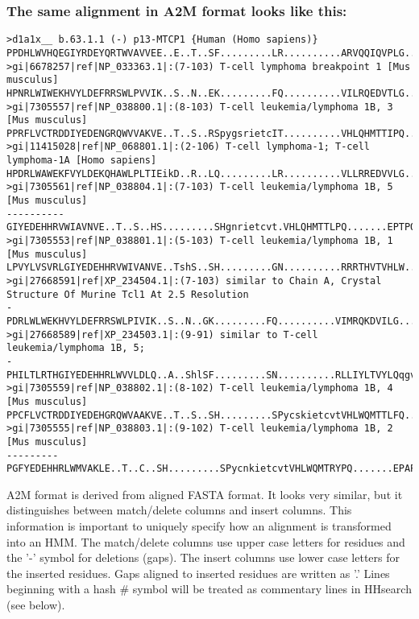 \documentclass[11pt,a4paper]{article}
\begin{document}
\subsubsection*{The same alignment in A2M format looks like this:}

\scriptsize\begin{verbatim}
>d1a1x__ b.63.1.1 (-) p13-MTCP1 {Human (Homo sapiens)}
PPDHLWVHQEGIYRDEYQRTWVAVVEE..E..T..SF.........LR..........ARVQQIQVPLG.......DAARPSHLLTS.....QLPLMWQLYPEERYMDNNSR
>gi|6678257|ref|NP_033363.1|:(7-103) T-cell lymphoma breakpoint 1 [Mus musculus]
HPNRLWIWEKHVYLDEFRRSWLPVVIK..S..N..EK.........FQ..........VILRQEDVTLG.......EAMSPSQLVPY.....ELPLMWQLYPKDRYRSCDSM
>gi|7305557|ref|NP_038800.1|:(8-103) T-cell leukemia/lymphoma 1B, 3 [Mus musculus]
PPRFLVCTRDDIYEDENGRQWVVAKVE..T..S..RSpygsrietcIT..........VHLQHMTTIPQ.......EPTPQQPINNN.....SLPTMWRLESMNTYTGTDGT
>gi|11415028|ref|NP_068801.1|:(2-106) T-cell lymphoma-1; T-cell lymphoma-1A [Homo sapiens]
HPDRLWAWEKFVYLDEKQHAWLPLTIEikD..R..LQ.........LR..........VLLRREDVVLG.......RPMTPTQIGPS.....LLPIMWQLYPDGRYRSSDSS
>gi|7305561|ref|NP_038804.1|:(7-103) T-cell leukemia/lymphoma 1B, 5 [Mus musculus]
----------GIYEDEHHRVWIAVNVE..T..S..HS.........SHgnrietcvt.VHLQHMTTLPQ.......EPTPQQPINNN.....SLPTMWRLESRNTYTGTDGT
>gi|7305553|ref|NP_038801.1|:(5-103) T-cell leukemia/lymphoma 1B, 1 [Mus musculus]
LPVYLVSVRLGIYEDEHHRVWIVANVE..TshS..SH.........GN..........RRRTHVTVHLW.......KLIPQQVIPFNplnydFLPTTWKLESRNIYWATDGT
>gi|27668591|ref|XP_234504.1|:(7-103) similar to Chain A, Crystal Structure Of Murine Tcl1 At 2.5 Resolution 
-PDRLWLWEKHVYLDEFRRSWLPIVIK..S..N..GK.........FQ..........VIMRQKDVILG.......DSMTPSQLVPY.....ELPLMWQLYPEERYRSSNSE
>gi|27668589|ref|XP_234503.1|:(9-91) similar to T-cell leukemia/lymphoma 1B, 5;
-PHILTLRTHGIYEDEHHRLWVVLDLQ..A..ShlSF.........SN..........RLLIYLTVYLQqgvafplESTPPSPMNLN.....GLPRRWTLRTMGTYEGTDNT
>gi|7305559|ref|NP_038802.1|:(8-102) T-cell leukemia/lymphoma 1B, 4 [Mus musculus] 
PPCFLVCTRDDIYEDEHGRQWVAAKVE..T..S..SH.........SPycskietcvtVHLWQMTTLFQ.......EPSPDSLKTFN.....FLPRTWRLESRNTYRGADAM
>gi|7305555|ref|NP_038803.1|:(9-102) T-cell leukemia/lymphoma 1B, 2 [Mus musculus]
---------PGFYEDEHHRLWMVAKLE..T..C..SH.........SPycnkietcvtVHLWQMTRYPQ.......EPAPYNPMNYN.....FLPMTWRLASMNTYRGTDAM
\end{verbatim}\normalsize

A2M format is derived from aligned FASTA format. It looks very similar, but it 
distinguishes between match/delete columns and insert columns. This information is 
important to uniquely specify how an alignment is transformed into an HMM. The 
match/delete columns use upper case letters for residues and the '-' symbol for 
deletions (gaps). The insert columns use lower case letters for the inserted residues. 
Gaps aligned to inserted residues are written as '.' Lines beginning with a hash \# 
symbol will be treated as commentary lines in HHsearch (see below).
\end{document}
